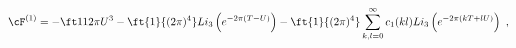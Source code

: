 \begin{equation}
\cF^{(1)} =  -\ft1{12\pi} U^3 - \ft{1}{(2 \pi)^4} Li_3 \left(
e^{-2 \pi (T-U)} \right)  - \ft{1}{(2 \pi)^4}
\sum_{k,l=0}^{\infty} c_1(kl) Li_3 \left( e^{-2\pi (kT + lU)}
\right)\ , \label{WeylChamber1}
\end{equation}

